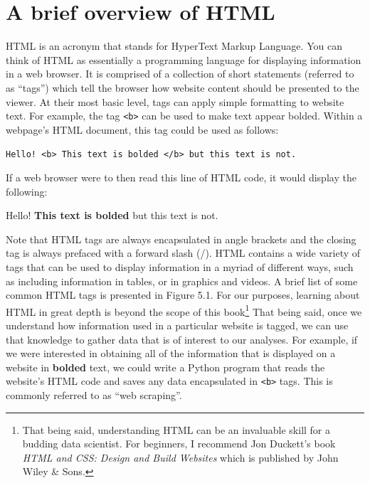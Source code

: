 \documentclass{book}
\begin{document}
\section{A brief overview of HTML}
	
	HTML is an acronym that stands for HyperText Markup Language. You can think of HTML as essentially a programming language for displaying information in a web browser. It is comprised of a collection of short statements (referred to as ``tags'') which tell the browser how website content should be presented to the viewer. At their most basic level, tags can apply simple formatting to website text. For example, the tag \texttt{<b>} can be used to make text appear bolded. Within a webpage's HTML document, this tag could be used as follows:
	
	\texttt{Hello! <b> This text is bolded </b> but this text is not.}
	
	If a web browser were to then read this line of HTML code, it would display the following:
	
	Hello! \textbf{This text is bolded} but this text is not.
	
	Note that HTML tags are always encapsulated in angle brackets and the closing tag is always prefaced with a forward slash (/). HTML contains a wide variety of tags that can be used to display information in a myriad of different ways, such as including information in tables, or in graphics and videos. A brief list of some common HTML tags is presented in Figure 5.1. For our purposes, learning about HTML in great depth is beyond the scope of this book\footnote{That being said, understanding HTML can be an invaluable skill for a budding data scientist. For beginners, I recommend Jon Duckett's book \textit{HTML and CSS: Design and Build Websites} which is published by John Wiley \& Sons.} That being said, once we understand how information used in a particular website is tagged, we can use that knowledge to gather data that is of interest to our analyses. For example, if we were interested in obtaining all of the information that is displayed on a website in \textbf{bolded} text, we could write a Python program that reads the website's HTML code and saves any data encapsulated in \texttt{<b>} tags. This is commonly referred to as ``web scraping''.
\end{document}
